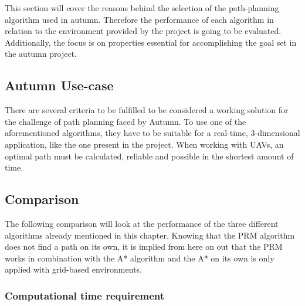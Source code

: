 This section will cover the reasons behind the selection of the path-planning algorithm used in autumn. Therefore the performance of each algorithm in relation to the environment provided by the project is going to be evaluated. Additionally, the focus is on properties essential for accomplishing the goal set in the autumn project.

\subsection{Autumn Use-case}

There are several criteria to be fulfilled to be considered a working solution for the challenge of path planning faced by Autumn.
To use one of the aforementioned algorithms, they have to be suitable for a real-time, 3-dimensional application, like the one present in the project.
When working with UAVs, an optimal path must be calculated, reliable and possible in the shortest amount of time. 

\subsection{Comparison}

The following comparison will look at the performance of the three different algorithms already mentioned in this chapter. Knowing that the PRM algorithm does not find a path on its own, it is implied from here on out that the PRM works in combination with the A* algorithm and the A* on its own is only applied with grid-based environments.  

\subsubsection{Computational time requirement}

